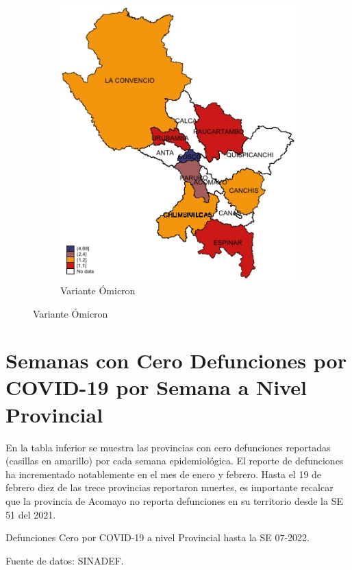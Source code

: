 \documentclass[12pt,a4paper,openany]{book}
\begin{document}
\begin{figure}[h]
\begin{subfigure}[b]{0.40\textwidth}
				\includegraphics[width=\textwidth]{../figuras/variantes_provincial_omicron.png}
				\caption{Variante Ómicron}
			\end{subfigure}
			\end{figure}

\clearpage


\clearpage
	\section*{Semanas con Cero Defunciones por COVID-19 por Semana a Nivel Provincial}
	
\noindent En la tabla inferior se muestra las provincias con cero defunciones reportadas (casillas en amarillo) por cada semana epidemiológica. El reporte de defunciones ha incrementado notablemente en el mes de enero y febrero. Hasta el 19 de febrero diez de las trece provincias reportaron muertes, es importante recalcar que la provincia de Acomayo no reporta defunciones en su territorio desde la SE 51 del 2021.    
	\begin{table}[h]		\caption{Defunciones Cero por COVID-19 a nivel Provincial hasta la SE 07-2022.}
		\resizebox{\textwidth}{!}{%
			
		}
		{\footnotesize {Fuente de datos: SINADEF.}}
	\end{table}
\pagebreak
\end{document}
